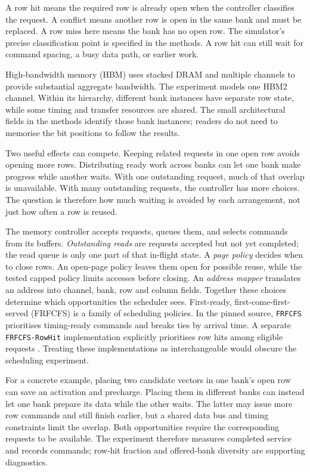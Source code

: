 \documentclass[11pt,a4paper]{report}
\begin{document}
A row hit means the required row is already open when the controller classifies the request. A conflict means another row is open in the same bank and must be replaced. A row miss here means the bank has no open row. The simulator's precise classification point is specified in the methods. A row hit can still wait for command spacing, a busy data path, or earlier work.

High-bandwidth memory (HBM) uses stacked DRAM and multiple channels to provide substantial aggregate bandwidth. The experiment models one HBM2 channel. Within its hierarchy, different bank instances have separate row state, while some timing and transfer resources are shared. The small architectural fields in the methods identify those bank instances; readers do not need to memorise the bit positions to follow the results.

Two useful effects can compete. Keeping related requests in one open row avoids opening more rows. Distributing ready work across banks can let one bank make progress while another waits. With one outstanding request, much of that overlap is unavailable. With many outstanding requests, the controller has more choices. The question is therefore how much waiting is avoided by each arrangement, not just how often a row is reused.

The memory controller accepts requests, queues them, and selects commands from its buffers. \emph{Outstanding reads} are requests accepted but not yet completed; the read queue is only one part of that in-flight state. A \emph{page policy} decides when to close rows. An open-page policy leaves them open for possible reuse, while the tested capped policy limits accesses before closing. An \emph{address mapper} translates an address into channel, bank, row and column fields. Together these choices determine which opportunities the scheduler sees. First-ready, first-come-first-served (FRFCFS) is a family of scheduling policies. In the pinned source, \texttt{FRFCFS} prioritises timing-ready commands and breaks ties by arrival time. A separate \texttt{FRFCFS-RowHit} implementation explicitly prioritises row hits among eligible requests \cite{ramsource}. Treating these implementations as interchangeable would obscure the scheduling experiment.

For a concrete example, placing two candidate vectors in one bank's open row can save an activation and precharge. Placing them in different banks can instead let one bank prepare its data while the other waits. The latter may issue more row commands and still finish earlier, but a shared data bus and timing constraints limit the overlap. Both opportunities require the corresponding requests to be available. The experiment therefore measures completed service and records commands; row-hit fraction and offered-bank diversity are supporting diagnostics.
\end{document}

